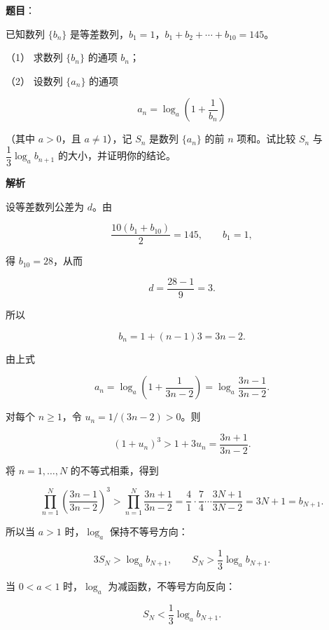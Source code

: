 \begin{answer}

\textbf{题目}：

已知数列 $\{b_n\}$ 是等差数列，$b_1=1$，$b_1+b_2+\cdots+b_{10}=145$。

（1） 求数列 $\{b_n\}$ 的通项 $b_n$；

（2） 设数列 $\{a_n\}$ 的通项

\nopagebreak[4]
\[
a_n=\log_a\left(1+\frac1{b_n}\right)
\]

（其中 $a>0$，且 $a\neq1$），记 $S_n$ 是数列 $\{a_n\}$ 的前 $n$ 项和。试比较 $S_n$ 与 $\dfrac13\log_a b_{n+1}$ 的大小，并证明你的结论。

\textbf{解析}


设等差数列公差为 $d$。由

\nopagebreak[4]
\[
\frac{10(b_1+b_{10})}{2}=145,\qquad b_1=1,
\]

得 $b_{10}=28$，从而

\nopagebreak[4]
\[
d=\frac{28-1}{9}=3.
\]

所以

\nopagebreak[4]
\[
b_n=1+(n-1)3=3n-2.
\]


由上式

\nopagebreak[4]
\[
a_n=\log_a\left(1+\frac1{3n-2}\right)
=\log_a\frac{3n-1}{3n-2}.
\]

对每个 $n\geqslant1$，令 $u_n=1/(3n-2)>0$。则

\nopagebreak[4]
\[
(1+u_n)^3>1+3u_n
=\frac{3n+1}{3n-2}.
\]

将 $n=1,\ldots,N$ 的不等式相乘，得到

\nopagebreak[4]
\[
\prod_{n=1}^{N}
\left(\frac{3n-1}{3n-2}\right)^3
>
\prod_{n=1}^{N}\frac{3n+1}{3n-2}
=\frac41\cdot\frac74\cdots\frac{3N+1}{3N-2}
=3N+1=b_{N+1}.
\]

所以当 $a>1$ 时，$\log_a$ 保持不等号方向：

\nopagebreak[4]
\[
3S_N>\log_a b_{N+1},
\qquad
S_N>\frac13\log_a b_{N+1}.
\]

当 $0<a<1$ 时，$\log_a$ 为减函数，不等号方向反向：

\nopagebreak[4]
\[
S_N<\frac13\log_a b_{N+1}.
\]



\end{answer}